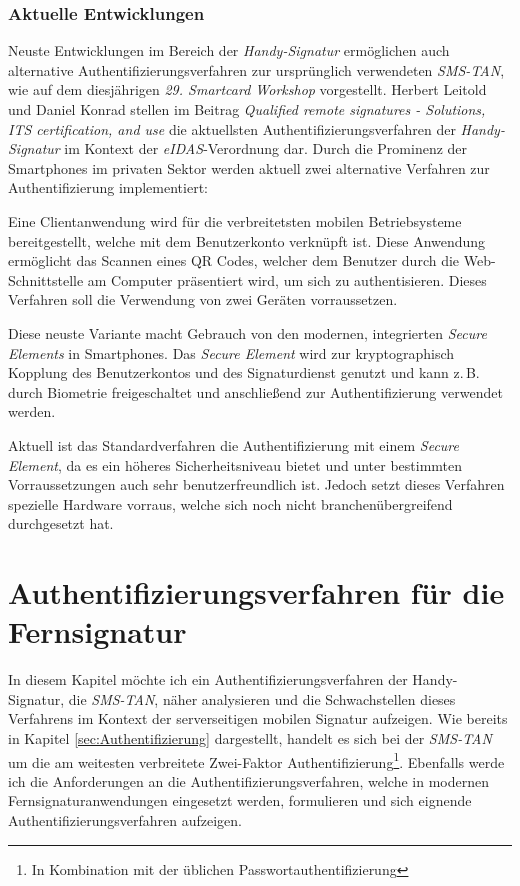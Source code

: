 \documentclass[11pt,a4paper,ngerman]{scrreprt}
\begin{document}
\subsection{Aktuelle Entwicklungen}\label{sec:scWorkshop}
Neuste Entwicklungen im Bereich der \textit{Handy-Signatur} ermöglichen auch alternative Authentifizierungsverfahren zur ursprünglich verwendeten \textit{SMS-TAN}, wie auf dem diesjährigen \textit{29. Smartcard Workshop} vorgestellt. Herbert Leitold und Daniel Konrad stellen im Beitrag \textit{Qualified remote signatures - Solutions, ITS certification, and use} \cite{scWorkshop} die aktuellsten Authentifizierungsverfahren der \textit{Handy-Signatur} im Kontext der \textit{eIDAS}-Verordnung dar. Durch die Prominenz der Smartphones im privaten Sektor werden aktuell zwei alternative Verfahren zur Authentifizierung implementiert:
\begin{description}[font=\rmfamily]
    \item[OTP mit QR Code:] Eine Clientanwendung wird für die verbreitetsten mobilen Betriebsysteme bereitgestellt, welche mit dem Benutzerkonto verknüpft ist. Diese Anwendung ermöglicht das Scannen eines QR Codes, welcher dem Benutzer durch die Web-Schnittstelle am Computer präsentiert wird, um sich zu authentisieren. Dieses Verfahren soll die Verwendung von zwei Geräten vorraussetzen.
    \item[Secure Hardware Element (SE):] Diese neuste Variante macht Gebrauch von den modernen, integrierten \textit{Secure Elements} in Smartphones. Das \textit{Secure Element} wird zur kryptographisch Kopplung des Benutzerkontos und des Signaturdienst genutzt und kann z.\,B. durch Biometrie freigeschaltet und anschließend zur Authentifizierung verwendet werden.
\end{description}
Aktuell ist das Standardverfahren die Authentifizierung mit einem \textit{Secure Element}, da es ein höheres Sicherheitsniveau bietet und unter bestimmten Vorraussetzungen auch sehr benutzerfreundlich ist. Jedoch setzt dieses Verfahren spezielle Hardware vorraus, welche sich noch nicht branchenübergreifend durchgesetzt hat.

\chapter{Authentifizierungsverfahren für die Fernsignatur}\label{sec:fernSignAuth}
In diesem Kapitel möchte ich ein Authentifizierungsverfahren der Handy-Signatur, die \textit{SMS-TAN}, näher analysieren und die Schwachstellen dieses Verfahrens im Kontext der serverseitigen mobilen Signatur aufzeigen. Wie bereits in Kapitel \ref{sec:Authentifizierung} dargestellt, handelt es sich bei der \textit{SMS-TAN} um die am weitesten verbreitete Zwei-Faktor Authentifizierung\footnote{In Kombination mit der üblichen Passwortauthentifizierung}. Ebenfalls werde ich die Anforderungen an die Authentifizierungsverfahren, welche in modernen Fernsignaturanwendungen eingesetzt werden, formulieren und sich eignende Authentifizierungsverfahren aufzeigen.
\end{document}

